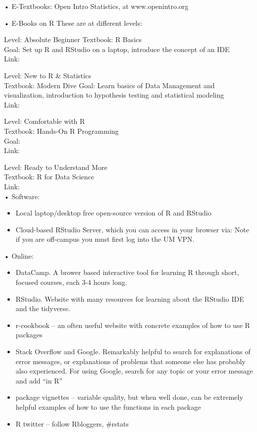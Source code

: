 \documentclass[]{book}
\providecommand{\tightlist}{%
  \setlength{\itemsep}{0pt}\setlength{\parskip}{0pt}}
\theoremstyle{definition}
\theoremstyle{definition}
\theoremstyle{definition}
\theoremstyle{remark}
\begin{document}
• E-Textbooks: Open Intro Statistics, at www.openintro.org

• E-Books on R These are at different levels:

Level: Absolute Beginner Textbook: R Basics\\
Goal: Set up R and RStudio on a laptop, introduce the concept of an
IDE\\
Link:

Level: New to R \& Statistics\\
Textbook: Modern Dive Goal: Learn basics of Data Management and
visualization, introduction to hypothesis testing and statistical
modeling\\
Link:

Level: Comfortable with R\\
Textbook: Hands-On R Programming\\
Goal:\\
Link:

Level: Ready to Understand More\\
Textbook: R for Data Science\\
Link:\\

• Software:

\begin{itemize}
\tightlist
\item
  Local laptop/desktop free open-source version of R and RStudio
\item
  Cloud-based RStudio Server, which you can access in your browser via:
  Note if you are off-campus you must first log into the UM VPN.
\end{itemize}

 • Online:

\begin{itemize}
\tightlist
\item
  DataCamp. A brower based interactive tool for learning R through
  short, focused courses, each 3-4 hours long.
\item
  RStudio. Website with many resources for learning about the RStudio
  IDE and the tidyverse.
\item
  r-cookbook -- an often useful website with concrete examples of how to
  use R packages
\item
  Stack Overflow and Google. Remarkably helpful to search for
  explanations of error messages, or explanations of problems that
  someone else has probably also experienced. For using Google, search
  for any topic or your error message and add ``in R''
\item
  package vignettes -- variable quality, but when well done, can be
  extremely helpful examples of how to use the functions in each package
\item
  R twitter -- follow Rbloggers, \#rstats 
\end{itemize}
\end{document}
